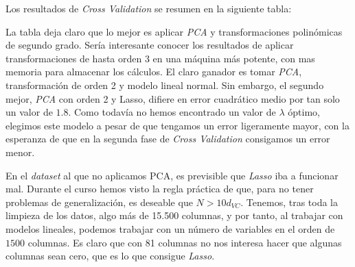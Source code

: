 \documentclass[11pt]{article}
\begin{document}
Los resultados de \emph{Cross Validation} se resumen en la siguiente tabla:

\begin{table}[H]
    \caption{Resultados de \emph{Cross Validation}, primera fase}
\end{table}

La tabla deja claro que lo mejor es aplicar \emph{PCA} y transformaciones polinómicas de segundo grado. Sería interesante conocer los resultados de aplicar transformaciones de hasta orden 3 en una máquina más potente, con mas memoria para almacenar los cálculos. El claro ganador es tomar \emph{PCA}, transformación de orden 2 y modelo lineal normal. Sin embargo, el segundo mejor, \emph{PCA} con orden 2 y Lasso, difiere en error cuadrático medio por tan solo un valor de $1.8$. Como todavía no hemos encontrado un valor de $\lambda$ óptimo, elegimos este modelo a pesar de que tengamos un error ligeramente mayor, con la esperanza de que en la segunda fase de \emph{Cross Validation} consigamos un error menor.

En el \emph{dataset} al que no aplicamos PCA, es previsible que \emph{Lasso} iba a funcionar mal. Durante el curso hemos visto la regla práctica de que, para no tener problemas de generalización, es deseable que $N > 10 d_{VC}
$. Tenemos, tras toda la limpieza de los datos, algo más de 15.500 columnas, y por tanto, al trabajar con modelos lineales, podemos trabajar con un número de variables en el orden de $1500$ columnas. Es claro que con 81 columnas no nos interesa hacer que algunas columnas sean cero, que es lo que consigue \emph{Lasso}.
\end{document}
